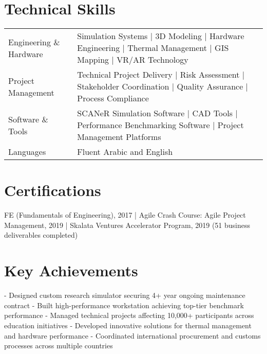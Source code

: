 \documentclass[a4paper,12pt]{article}
\begin{document}
\section{Technical Skills}
\begin{tabularx}{\linewidth}{@{}l X@{}}
Engineering \& Hardware & Simulation Systems | 3D Modeling | Hardware Engineering | Thermal Management | GIS Mapping | VR/AR Technology \\
Project Management & Technical Project Delivery | Risk Assessment | Stakeholder Coordination | Quality Assurance | Process Compliance \\
Software \& Tools & SCANeR Simulation Software | CAD Tools | Performance Benchmarking Software | Project Management Platforms \\
Languages & Fluent Arabic and English \\
\end{tabularx}

\section{Certifications}
FE (Fundamentals of Engineering), 2017 | Agile Crash Course: Agile Project Management, 2019 | Skalata Ventures Accelerator Program, 2019 (51 business deliverables completed)

\section{Key Achievements}
- Designed custom research simulator securing 4+ year ongoing maintenance contract  
- Built high-performance workstation achieving top-tier benchmark performance  
- Managed technical projects affecting 10,000+ participants across education initiatives  
- Developed innovative solutions for thermal management and hardware performance  
- Coordinated international procurement and customs processes across multiple countries  

\vfill
{}
\end{document}

